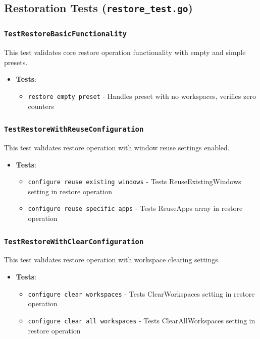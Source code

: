 \subsection{Restoration Tests (\texttt{restore\_test.go})}

\subsubsection*{\texttt{TestRestoreBasicFunctionality}}
This test validates core restore operation functionality with empty and simple presets.
\begin{itemize}
    \item \textbf{Tests}:
    \begin{itemize}
        \item \texttt{restore empty preset} - Handles preset with no workspaces, verifies zero counters
    \end{itemize}
\end{itemize}

\subsubsection*{\texttt{TestRestoreWithReuseConfiguration}}
This test validates restore operation with window reuse settings enabled.
\begin{itemize}
    \item \textbf{Tests}:
    \begin{itemize}
        \item \texttt{configure reuse existing windows} - Tests ReuseExistingWindows setting in restore operation
        \item \texttt{configure reuse specific apps} - Tests ReuseApps array in restore operation
    \end{itemize}
\end{itemize}

\subsubsection*{\texttt{TestRestoreWithClearConfiguration}}
This test validates restore operation with workspace clearing settings.
\begin{itemize}
    \item \textbf{Tests}:
    \begin{itemize}
        \item \texttt{configure clear workspaces} - Tests ClearWorkspaces setting in restore operation
        \item \texttt{configure clear all workspaces} - Tests ClearAllWorkspaces setting in restore operation
    \end{itemize}
\end{itemize}

